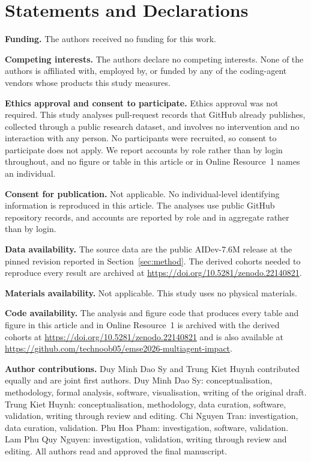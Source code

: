 \documentclass[lineno,pdflatex,sn-basic]{sn-jnl}
\begin{document}
\backmatter

\section*{Statements and Declarations}

\noindent\textbf{Funding.} The authors received no funding for this work.

\noindent\textbf{Competing interests.} The authors declare no competing
interests. None of the authors is affiliated with, employed by, or funded by any
of the coding-agent vendors whose products this study measures.

\noindent\textbf{Ethics approval and consent to participate.} Ethics approval
was not required. This study analyses pull-request records that GitHub already
publishes, collected through a public research dataset, and involves no
intervention and no interaction with any person. No participants were recruited,
so consent to participate does not apply. We report accounts by role rather than
by login throughout, and no figure or table in this article or in Online
Resource~1 names an individual.

\noindent\textbf{Consent for publication.} Not applicable. No individual-level
identifying information is reproduced in this article. The analyses use public
GitHub repository records, and accounts are reported by role and in aggregate
rather than by login.

\noindent\textbf{Data availability.} The source data are the public
AIDev-7.6M release at the pinned revision reported in
Section~\ref{sec:method}. The derived cohorts needed to reproduce every result
are archived at \url{https://doi.org/10.5281/zenodo.22140821}.

\noindent\textbf{Materials availability.} Not applicable. This study uses no
physical materials.

\noindent\textbf{Code availability.} The analysis and figure code that
produces every table and figure in this article and in Online Resource~1 is
archived with the derived cohorts at \url{https://doi.org/10.5281/zenodo.22140821} and is also
available at \url{https://github.com/technoob05/emse2026-multiagent-impact}.

\noindent\textbf{Author contributions.} Duy Minh Dao Sy and Trung Kiet Huynh
contributed equally and are joint first authors. Duy Minh Dao Sy:
conceptualisation, methodology, formal analysis, software, visualisation,
writing of the original draft. Trung Kiet Huynh: conceptualisation, methodology,
data curation, software, validation, writing through review and editing. Chi
Nguyen Tran: investigation, data curation, validation. Phu Hoa Pham:
investigation, software, validation. Lam Phu Quy Nguyen: investigation,
validation, writing through review and editing. All authors read and approved
the final manuscript.


\end{document}
